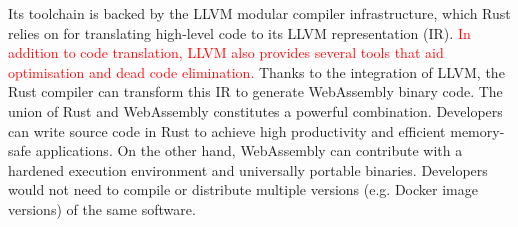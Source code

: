 Its toolchain is backed by the LLVM modular compiler infrastructure, which Rust relies on for translating high-level code to its LLVM representation (IR). \textcolor{red}{In addition to code translation, LLVM also provides several tools that aid optimisation and dead code elimination.} Thanks to the integration of LLVM, the Rust compiler can transform this IR to generate WebAssembly binary code. The union of Rust and WebAssembly constitutes a powerful combination. Developers can write source code in Rust to achieve high productivity and efficient memory-safe applications. On the other hand, WebAssembly can contribute with a hardened execution environment and universally portable binaries. Developers would not need to compile or distribute multiple versions (e.g. Docker image versions) of the same software. 





